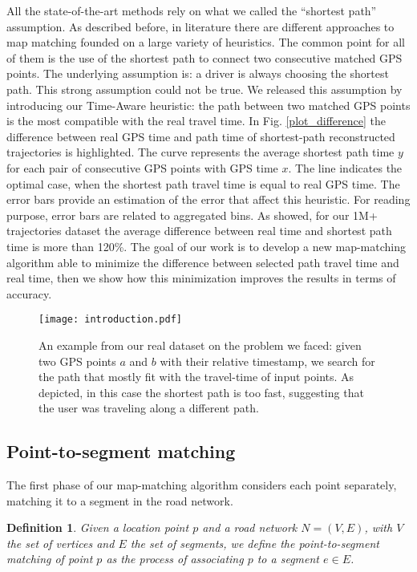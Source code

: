 \documentclass[5p]{elsarticle}
\newtheorem{definition}{Definition}
\begin{document}
All the state-of-the-art methods rely on what we called the ``shortest path'' assumption. As described before, in literature there are different approaches to map matching founded on a large variety of heuristics. The common point for all of
them is the use of the shortest path to connect two consecutive matched GPS points. The underlying assumption is: a driver is always choosing the shortest path. This strong assumption could not be true. We released 
this assumption by introducing our Time-Aware heuristic: the path between two matched GPS points is the most compatible with the real travel time. 
In Fig. \ref{plot_difference} the difference between real GPS time and path time of shortest-path reconstructed trajectories is highlighted. 
The curve represents the average shortest path time $y$ for each pair of consecutive GPS points with GPS time $x$. The line indicates the optimal case, when the shortest path travel time is equal to real GPS time.
The error bars provide an estimation of the error that affect this heuristic. For reading purpose, error bars are related to aggregated bins. As showed, for our 1M+ trajectories dataset the average difference between real time and shortest path time  is more than 120\%. 
The goal of our work is to develop a new map-matching algorithm able to minimize the difference between selected path travel time and real time, then we show how this minimization improves the results in terms of accuracy.

\begin{figure*}[t!]

\centering
\texttt{[image: introduction.pdf]}
\caption{An example from our real dataset on the problem we faced: given two GPS points $a$ and $b$ with their relative timestamp, we search for the path that mostly fit with the travel-time of input points. As depicted,
in this case the shortest path is too fast, suggesting that the user was traveling along a different path.}
\label{introduction_case}
\end{figure*}



\subsection{Point-to-segment matching}

The first phase of our map-matching algorithm considers each point separately, matching it to a segment in the road network.


\begin{definition}
Given a location point $p$ and a road network $N=(V,E)$, with $V$ the set of vertices and $E$ the set of segments, 
we define the point-to-segment matching of point $p$ as the process of associating $p$ to a segment $e \in E$. 
\end{definition}
\end{document}
